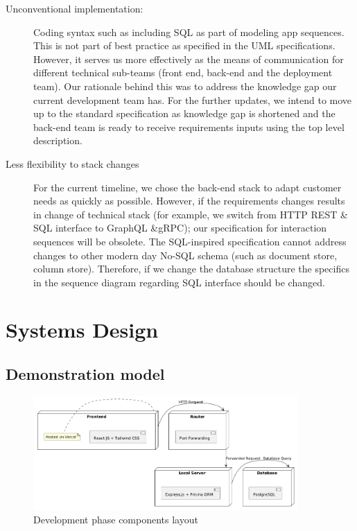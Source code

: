 \begin{description}
	\item[Unconventional implementation:] Coding syntax such as including SQL as part of modeling app sequences. This is not part of best practice as specified in the UML specifications. However, it serves us more effectively as the means of communication for different technical sub-teams (front end, back-end and the deployment team). Our rationale behind this was to address the knowledge gap our current development team has. For the further updates, we intend to move up to the standard specification as knowledge gap is shortened and the back-end team is ready to receive requirements inputs using the top level description.
	\item[Less flexibility to stack changes] For the current timeline, we chose the back-end stack to adapt customer needs as quickly as possible. However, if the requirements changes results in change of technical stack (for example, we switch from HTTP REST \& SQL interface to GraphQL \&gRPC); our specification for interaction sequences will be obsolete. The SQL-inspired specification cannot address changes to other modern day No-SQL schema (such as document store, column store). Therefore, if we change the database structure the specifics in the sequence diagram regarding SQL interface should be changed.
\end{description}

\section{Systems Design}


\subsection{Demonstration model}

\begin{figure}[!h]
	\centering
	\includegraphics[width=0.9\textwidth]{chapters/ch-04/401_deploy_local.png} %
	\caption{Development phase components layout}
	\label{fig:deploy_1} %
\end{figure}

